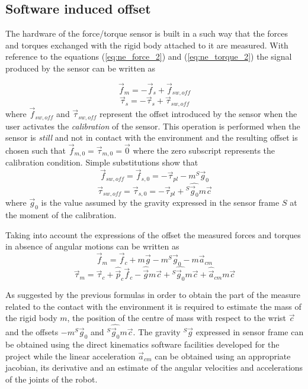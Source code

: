 \subsection{Software induced offset}
The hardware of the force/torque sensor is built in a such way that the forces and torques exchanged
with the rigid body attached to it are measured. With reference to the equations (\ref{eq:ne_force_2})
and (\ref{eq:ne_torque_2}) the signal produced by the sensor can be written as

\begin{equation*}
  \vec{f}_{m} = -\vec{f}_{s} + \vec{f}_{sw,off}
\end{equation*}
\begin{equation*}
  \vec{\tau}_{s} = -\vec{\tau}_{s} + \vec{\tau}_{sw,off}
\end{equation*}
where $\vec{f}_{sw, off}$ and $\vec{\tau}_{sw,off}$ represent the offset introduced by
the sensor when the user activates the \emph{calibration} of the sensor. This operation
is performed when the sensor is \emph{still} and not in contact with the environment
and the resulting offset is chosen such that $\vec{f}_{m,0} = \vec{\tau}_{m,0} = \vec{0}$
where the zero subscript represents the calibration condition. Simple substitutions show that
\begin{equation*}
\vec{f}_{sw,off} = \vec{f}_{s,0} = -\vec{\tau}_{pl} -m {}^S \vec{g}_{0}
\end{equation*}
\begin{equation*}
\vec{\tau}_{sw,off} = \vec{\tau}_{s,0} = -\vec{\tau}_{pl} + {}^S \hat{\vec{g}_{0}} m\vec{c}
\end{equation*}
where $\vec{g}_{0}$ is the value assumed by the gravity expressed in the sensor frame $S$ at the
moment of the calibration.
\par
Taking into account the expressions of the offset the measured forces and torques in absence of angular
motions can be written as
\begin{equation}\label{eq:m_force_2}
  \vec{f}_{m} = \vec{f}_{c} +m \vec{g} -m {}^S \vec{g}_{0} - m  \vec{a}_{cm}
\end{equation}
\begin{equation}\label{eq:m_torque_2}
  \vec{\tau}_{m} = \vec{\tau}_{c} + \hat{\vec{p}}_{c}  \vec{f}_{c}
  - \hat{\vec{g}} m\vec{c} + {}^S \hat{\vec{g}_{0}} m\vec{c} +  \hat{\vec{a}}_{cm} m  \vec{c}
\end{equation}
\par
As suggested by the previous formulas in order to obtain the part of the measure related to the contact
with the environment it is required to estimate the mass of the rigid body $m$, the position of the centre of
mass with respect to the wrist $\vec{c}$ and the offsets $-m {}^S \vec{g}_{0}$ and ${}^S \hat{\vec{g}_{0}} m\vec{c}$.
The gravity ${}^S \vec{g}$ expressed in sensor frame can be obtained using the direct kinematics software facilities
developed for the project while the linear acceleration $\vec{a}_{cm}$ can be obtained using an appropriate
jacobian, its derivative and an estimate of the angular velocities and accelerations of the joints
of the robot.

